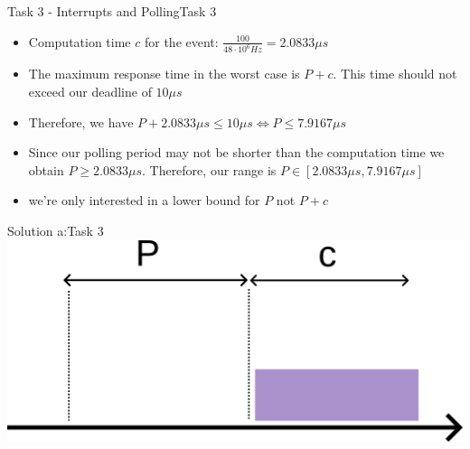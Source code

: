 \begin{frame}[fragile]{Task 3 - Interrupts and Polling}{Task 3}
  \begin{solution}
        \begin{itemize}
          \item Computation time $c$ for the event: $\frac{100}{48 \cdot 10^6 Hz} = 2.0833\mu s$
          \item The maximum response time in the worst case is $P + c$. This time should not exceed our deadline of $10 \mu s$
          \item Therefore, we have $P + 2.0833\mu s \leq 10\mu s \Longleftrightarrow P \leq 7.9167\mu s$
          \item Since our polling period may not be shorter than the computation time we obtain $P \geq 2.0833\mu s$. Therefore, our range is $P \in [2.0833\mu s, 7.9167\mu s]$
          \item we're only interested in a lower bound for $P$ not $P+c$
        \end{itemize}
  \end{solution}
\end{frame}

\begin{frame}{Solution a:}{Task 3}
  \centering
  \includegraphics[height=0.35\paperheight]{figures/task3-a.png}
\end{frame}

